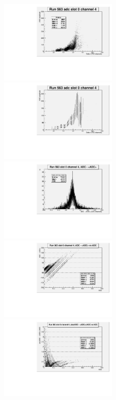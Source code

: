 \documentclass{article}
\begin{document}
\begin{figure}[htbp]
\includegraphics[width=0.5\textwidth]{walk_stage1}%
\includegraphics[width=0.5\textwidth]{walk_stage2}\\
\includegraphics[width=0.5\textwidth]{walk_stage3}%
\includegraphics[width=0.5\textwidth]{walk_stage4}\\
\includegraphics[width=0.5\textwidth]{walk_stage5}%

\end{figure}
\end{document}
